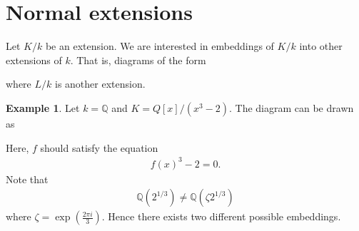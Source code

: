 \documentclass[12pt]{report}
\theoremstyle{plain}
\theoremstyle{remark}
\theoremstyle{definition}
\newtheorem{example}[theorem]{Example}
\newcommand{\Q}{\mathbb{Q}}
\newcommand{\C}{\mathbb{C}}
\begin{document}
\clearpage
\section{Normal extensions}
Let $K/k$ be an extension. We are interested in embeddings of $K/k$ into other extensions of $k$. That is, diagrams of the form
\begin{figure}[H]
    \centering
\end{figure}
\noindent
where $L/k$ is another extension.

\begin{example}
    Let $k=\Q$ and $K=Q[x]/(x^3-2)$. The diagram can be drawn as
    \begin{figure}[H]
        \centering
    \end{figure}
    \noindent
    Here, $f$ should satisfy the equation
    \begin{align*}
        f(x)^3 - 2 = 0.
    \end{align*}
    Note that
    \begin{align*}
        \Q(2^{1/3}) \neq \Q(\zeta2^{1/3})
    \end{align*}
    where $\zeta = \exp \left( \frac{2\pi i}{3} \right)$. Hence there exists two different possible embeddings.
\end{example}
\end{document}
